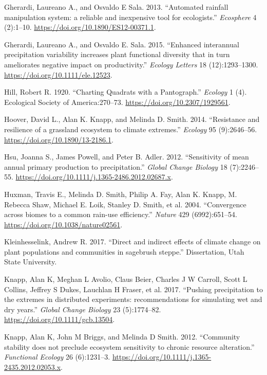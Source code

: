 \documentclass[fleqn,10pt,lineno]{wlpeerj} %
\begin{document}
\leavevmode\hypertarget{ref-Gherardi2013}{}%
Gherardi, Laureano A., and Osvaldo E Sala. 2013. ``Automated rainfall
manipulation system: a reliable and inexpensive tool for ecologists.''
\emph{Ecosphere} 4 (2):1--10.
\url{https://doi.org/10.1890/ES12-00371.1}.

\leavevmode\hypertarget{ref-Gherardi2015}{}%
Gherardi, Laureano A., and Osvaldo E. Sala. 2015. ``Enhanced interannual
precipitation variability increases plant functional diversity that in
turn ameliorates negative impact on productivity.'' \emph{Ecology
Letters} 18 (12):1293--1300. \url{https://doi.org/10.1111/ele.12523}.

\leavevmode\hypertarget{ref-Hill1920}{}%
Hill, Robert R. 1920. ``Charting Quadrats with a Pantograph.''
\emph{Ecology} 1 (4). Ecological Society of America:270--73.
\url{https://doi.org/10.2307/1929561}.

\leavevmode\hypertarget{ref-Hoover2014}{}%
Hoover, David L., Alan K. Knapp, and Melinda D. Smith. 2014.
``Resistance and resilience of a grassland ecosystem to climate
extremes.'' \emph{Ecology} 95 (9):2646--56.
\url{https://doi.org/10.1890/13-2186.1}.

\leavevmode\hypertarget{ref-Hsu2012}{}%
Hsu, Joanna S., James Powell, and Peter B. Adler. 2012. ``Sensitivity of
mean annual primary production to precipitation.'' \emph{Global Change
Biology} 18 (7):2246--55.
\url{https://doi.org/10.1111/j.1365-2486.2012.02687.x}.

\leavevmode\hypertarget{ref-Huxman2004}{}%
Huxman, Travis E., Melinda D. Smith, Philip A. Fay, Alan K. Knapp, M.
Rebecca Shaw, Michael E. Loik, Stanley D. Smith, et al. 2004.
``Convergence across biomes to a common rain-use efficiency.''
\emph{Nature} 429 (6992):651--54.
\url{https://doi.org/10.1038/nature02561}.

\leavevmode\hypertarget{ref-Kleinhesselink2017b}{}%
Kleinhesselink, Andrew R. 2017. ``Direct and indirect effects of climate
change on plant populations and communities in sagebrush steppe.''
Dissertation, Utah State University.

\leavevmode\hypertarget{ref-Knapp2017}{}%
Knapp, Alan K, Meghan L Avolio, Claus Beier, Charles J W Carroll, Scott
L Collins, Jeffrey S Dukes, Lauchlan H Fraser, et al. 2017. ``Pushing
precipitation to the extremes in distributed experiments:
recommendations for simulating wet and dry years.'' \emph{Global Change
Biology} 23 (5):1774--82. \url{https://doi.org/10.1111/gcb.13504}.

\leavevmode\hypertarget{ref-Knapp2012}{}%
Knapp, Alan K, John M Briggs, and Melinda D Smith. 2012. ``Community
stability does not preclude ecosystem sensitivity to chronic resource
alteration.'' \emph{Functional Ecology} 26 (6):1231--3.
\url{https://doi.org/10.1111/j.1365-2435.2012.02053.x}.
\end{document}
